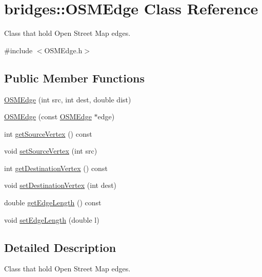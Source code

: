 \hypertarget{classbridges_1_1_o_s_m_edge}{}\section{bridges\+:\+:O\+S\+M\+Edge Class Reference}
\label{classbridges_1_1_o_s_m_edge}


Class that hold Open Street Map edges.  




{\ttfamily \#include $<$O\+S\+M\+Edge.\+h$>$}

\subsection*{Public Member Functions}
\begin{DoxyCompactItemize}
\item 
\mbox{\hyperlink{classbridges_1_1_o_s_m_edge_ace6b587439a5c3957f72a9d48e9782eb}{O\+S\+M\+Edge}} (int src, int dest, double dist)
\item 
\mbox{\hyperlink{classbridges_1_1_o_s_m_edge_ab76af0cbc8a84362edc6912e243ff2ef}{O\+S\+M\+Edge}} (const \mbox{\hyperlink{classbridges_1_1_o_s_m_edge}{O\+S\+M\+Edge}} $\ast$edge)
\item 
int \mbox{\hyperlink{classbridges_1_1_o_s_m_edge_a0779634f83c4b386d10bbfd722a0f0b7}{get\+Source\+Vertex}} () const
\item 
void \mbox{\hyperlink{classbridges_1_1_o_s_m_edge_a32f40057bf1f58a4778e346b27143e8e}{set\+Source\+Vertex}} (int src)
\item 
int \mbox{\hyperlink{classbridges_1_1_o_s_m_edge_a6bdd47593d6d0ecd05f516085db98b61}{get\+Destination\+Vertex}} () const
\item 
void \mbox{\hyperlink{classbridges_1_1_o_s_m_edge_abfa6c323ee87dbba16fd56ddf925286d}{set\+Destination\+Vertex}} (int dest)
\item 
double \mbox{\hyperlink{classbridges_1_1_o_s_m_edge_a3cb7d8550367d382ec712d08eb5e48db}{get\+Edge\+Length}} () const
\item 
void \mbox{\hyperlink{classbridges_1_1_o_s_m_edge_aa1572ac5cc99e423d0a7210151bf0877}{set\+Edge\+Length}} (double l)
\end{DoxyCompactItemize}


\subsection{Detailed Description}
Class that hold Open Street Map edges. 

